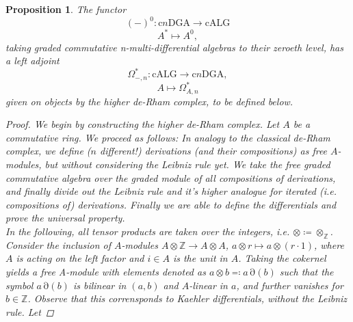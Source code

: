 \documentclass[10pt, a4paper, UKenglish]{article}
\numberwithin{equation}{section}
\newcommand{\bZ}{\mathbb{Z}}
\newcommand{\comm}[1]{\colorbox{yellow}{#1}}
\newcommand{\cndga}{\mathrm{c}n\mathrm{DGA}}
\newcommand{\calg}{\mathrm{cALG}}
\newcommand{\omg}[3]{\Omega_{#1,#2}^{#3}}
\theoremstyle{plain}
\newtheorem{prop}[equation]{Proposition}
\theoremstyle{definition}
\renewcommand{\to}{\longrightarrow}
\newcommand{\del}{\operatorname{\partial}}
\begin{document}
\begin{prop}\label{prop_higher_de_rahm_complex}
The functor%
$$(-)^0 : \cndga \to \calg$$%
$$A^* \longmapsto A^0,$$%
taking graded commutative n-multi-differential algebras to their zeroeth level, has a left adjoint%
$$\omg{-}{n}{*}: \calg \to \cndga,$$%
$$A \longmapsto \omg{A}{n}{*}$$
given on objects by the higher de-Rham complex, to be defined below.
\begin{proof}
We begin by constructing the higher de-Rham complex. Let $A$ be a commutative ring. We proceed as follows: In analogy to the classical de-Rham complex, we define ($n$ different!) derivations (and their compositions) as free $A$-modules, but without considering the Leibniz rule yet. We take the free graded commutative algebra over the graded module of all compositions of derivations, and finally divide out the Leibniz rule and it's higher analogue for iterated (i.e. compositions of) derivations. Finally we are able to define the differentials and prove the universal property.\\
In the following, all tensor products are taken over the integers, i.e. $\otimes \coloneqq \otimes_{\bZ}$. Consider the inclusion of $A$-modules $A \otimes \bZ \to A \otimes A$, $a\otimes r \longmapsto a \otimes (r \cdot 1)$, where $A$ is acting on the left factor and $i \in A$ is the unit in $A$. Taking the cokernel yields a free A-module with elements denoted as $a\otimes b \eqqcolon a \del (b)$ such that the symbol $a \del (b)$ is bilinear in $(a,b)$ and $A$-linear in $a$, and further vanishes for $b \in \bZ$. Observe that this corrensponds to Kaehler differentials, without the Leibniz rule. Let

\end{proof}
\end{prop}
\end{document}
